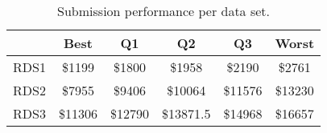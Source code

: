 \begin{table}
\footnotesize
\caption{Submission performance per data set.}
\centering
\begin{tabular}{c||c|c|c|c|c}
\hline \hline
                 & Best                 & Q1                 & Q2                & Q3                & Worst \\ 
\hline
RDS1 & \$1199   & \$1800   & \$1958  & \$2190  & \$2761 \\
\hline
RDS2 & \$7955   & \$9406   & \$10064  & \$11576  & \$13230 \\
\hline
RDS3 & \$11306   & \$12790   & \$13871.5  & \$14968  & \$16657 \\
\end{tabular} 
\label{table:result} 
\end{table}